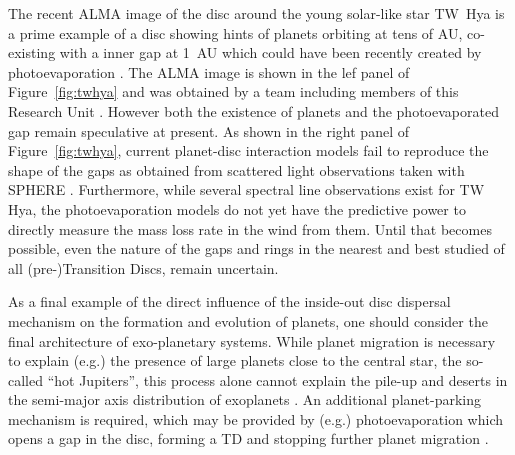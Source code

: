 \documentclass[10pt,fleqn,twoside]{article}
\begin{document}
The recent ALMA image of the disc around the young solar-like star TW~Hya is a prime example of a disc showing hints of
planets orbiting at tens of AU,  co-existing with a inner gap at 1~AU
which could have been 
recently created by photoevaporation \citep{2017MNRAS.464L..95E}. The ALMA image
is shown in the lef panel of Figure~\ref{fig:twhya} and was obtained by
a team including members of this Research Unit \citep{2016ApJ...820L..40A}. 
However both the existence of planets and the
photoevaporated gap remain speculative at present. As shown in the
right panel of Figure~\ref{fig:twhya}, current planet-disc interaction
models fail to reproduce the shape of the gaps as obtained from
scattered light observations taken with SPHERE \citep{2016arXiv161008939V}. 
Furthermore, while several spectral line observations exist
for TW Hya, the photoevaporation models do not yet have the predictive
power to directly measure the mass loss rate in the wind from
them. Until that becomes possible, even the nature of the gaps and
rings in 
the nearest and best studied of all (pre-)Transition Discs, remain
uncertain. 

As a final example of the direct influence of the inside-out disc dispersal
mechanism on the formation and evolution of planets, one should
consider 
the final architecture of
exo-planetary systems. While planet migration is necessary to explain
(e.g.) the presence of large planets close to the central star, the
so-called ``hot Jupiters'', this process alone cannot explain the pile-up and
deserts in the semi-major axis distribution of exoplanets 
\citep[see also][]{2014ApJ...780...53C, 2015ApJ...798L..32C}. An
additional planet-parking mechanism is required, which may be provided by (e.g.)
photoevaporation which opens a gap in the disc, forming a TD and
stopping further planet migration \citep[e.g.,][]{2012MNRAS.422L..82A, 
2015MNRAS.450.3008E}.

\end{document}
